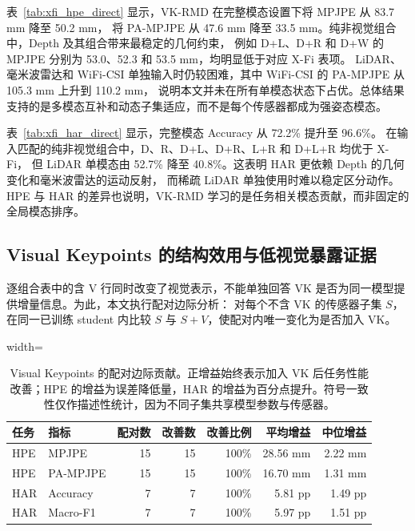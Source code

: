 \documentclass[journal]{IEEEtran}
\newcommand{\parahead}[1]{\vspace{0.4em}\noindent{\textbf{#1}}}
\begin{document}
\parahead{人体姿态估计。}
表~\ref{tab:xfi_hpe_direct} 显示，VK-RMD 在完整模态设置下将 MPJPE 从 83.7 mm 降至 50.2 mm，
将 PA-MPJPE 从 47.6 mm 降至 33.5 mm。纯非视觉组合中，Depth 及其组合带来最稳定的几何约束，
例如 D+L、D+R 和 D+W 的 MPJPE 分别为 53.0、52.3 和 53.5 mm，均明显低于对应 X-Fi 表项。
LiDAR、毫米波雷达和 WiFi-CSI 单独输入时仍较困难，其中 WiFi-CSI 的 PA-MPJPE 从 105.3 mm 上升到 110.2 mm，
说明本文并未在所有单模态状态下占优。总体结果支持的是多模态互补和动态子集适应，而不是每个传感器都成为强姿态模态。

\parahead{人体活动识别。}

表~\ref{tab:xfi_har_direct} 显示，完整模态 Accuracy 从 72.2\% 提升至 96.6\%。
在输入匹配的纯非视觉组合中，D、R、D+L、D+R、L+R 和 D+L+R 均优于 X-Fi，
但 LiDAR 单模态由 52.7\% 降至 40.8\%。这表明 HAR 更依赖 Depth 的几何变化和毫米波雷达的运动反射，
而稀疏 LiDAR 单独使用时难以稳定区分动作。HPE 与 HAR 的差异也说明，VK-RMD 学习的是任务相关模态贡献，而非固定的全局模态排序。

\subsection{Visual Keypoints 的结构效用与低视觉暴露证据}

逐组合表中的含 V 行同时改变了视觉表示，不能单独回答 VK 是否为同一模型提供增量信息。为此，本文执行配对边际分析：
对每个不含 VK 的传感器子集 $S$，在同一已训练 student 内比较 $S$ 与 $S+V$，使配对内唯一变化为是否加入 VK。

\begin{table}[H]
    \centering
    \caption{Visual Keypoints 的配对边际贡献。正增益始终表示加入 VK 后任务性能改善；HPE 的增益为误差降低量，HAR 的增益为百分点提升。符号一致性仅作描述性统计，因为不同子集共享模型参数与传感器。}
    \label{tab:vk_paired_marginal}
    \begin{adjustbox}{width=\columnwidth}
    \begin{tabular}{llrrrrr}
        \toprule
        任务 & 指标 & 配对数 & 改善数 & 改善比例 & 平均增益 & 中位增益 \\
        \midrule
        HPE & MPJPE & 15 & 15 & 100\% & 28.56 mm & 2.22 mm \\
        HPE & PA-MPJPE & 15 & 15 & 100\% & 16.70 mm & 1.31 mm \\
        HAR & Accuracy & 7 & 7 & 100\% & 5.81 pp & 1.49 pp \\
        HAR & Macro-F1 & 7 & 7 & 100\% & 5.97 pp & 1.51 pp \\
        \bottomrule
    \end{tabular}
    \end{adjustbox}
\end{table}
\end{document}
